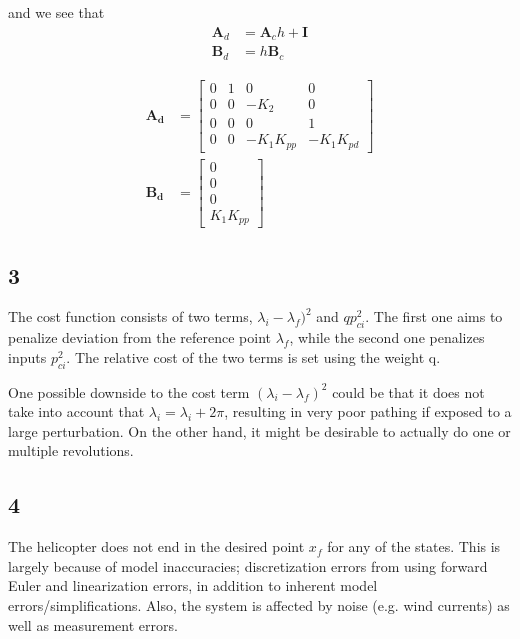 and we see that
\begin{subequations}
    \begin{align}
        \mathbf{A}_d &= \mathbf{A}_ch+\mathbf{I} \\
        \mathbf{B}_d &= h\mathbf{B}_c
    \end{align}

\end{subequations}

\begin{subequations}
    \begin{align}
        \mathbf{A_d} &= \begin{bmatrix}
        0 & 1 & 0 & 0\\
        0 & 0 & -K_2 & 0\\
        0 & 0 & 0 & 1\\
        0 & 0 & -K_1K_{pp} & -K_1K_{pd}
        \end{bmatrix}\\
        \mathbf{B_d} &= \begin{bmatrix}
        0\\
        0\\
        0\\
        K_1K_{pp}
    \end{bmatrix}
    \end{align}
\end{subequations}

\subsection{3}
The cost function  consists of two terms, $\lambda_i - \lambda_f)^2$ and $qp_{ci}^2$. The first one aims to penalize deviation from the reference point $\lambda_f$, while the second one penalizes inputs $p_{ci}^2$. The relative cost of the two terms is set using the weight q.

One possible downside to the cost term $(\lambda_i - \lambda_f)^2$ could be that it does not take into account that $\lambda_i = \lambda_ i + 2\pi$, resulting in very poor pathing if exposed to a large perturbation. On the other hand, it might be desirable to actually do one or multiple revolutions.

\subsection{4}
The helicopter does not end in the desired point $x_f$ for any of the states. This is largely  because of model inaccuracies; discretization errors from using forward Euler and linearization errors, in addition to inherent model errors/simplifications. Also, the system is affected by noise (e.g. wind currents) as well as measurement errors.

